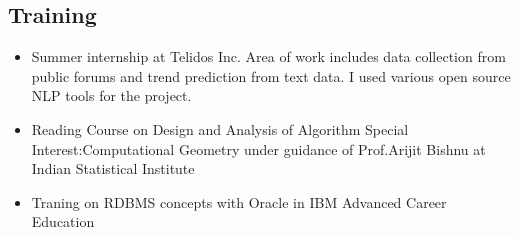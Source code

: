 \documentclass{res}
\begin{document}
\begin{resume}
\section{Training}
   \begin{itemize}[leftmargin=-2.1em]

\item Summer internship at Telidos Inc. Area of work includes data collection from public forums
and trend prediction from text data. I used various open source NLP tools for the project.

\item     Reading Course on Design and Analysis of Algorithm 
    Special Interest:Computational Geometry 
    under guidance of Prof.Arijit Bishnu at
    Indian Statistical Institute 

\item    Traning on RDBMS concepts with Oracle in
    IBM Advanced Career Education \\    
\end{itemize}     



%
%
%


\end{resume}
\end{document}
